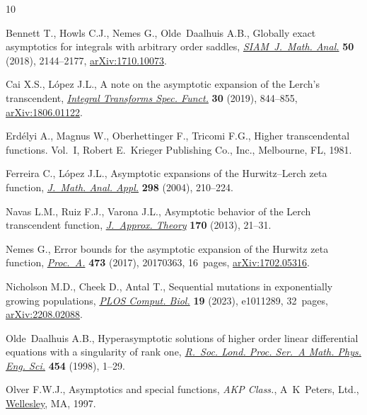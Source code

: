 \documentclass[pdftex]{sigma}
\numberwithin{equation}{section}
\begin{document}
\begin{thebibliography}{10}
\footnotesize\itemsep=0pt

Bennett T., Howls C.J., Nemes G., Olde~Daalhuis A.B., Globally exact
 asymptotics for integrals with arbitrary order saddles, \href{https://doi.org/10.1137/17M1154217}{\textit{SIAM~J.~Math.
 Anal.}} \textbf{50} (2018), 2144--2177, \href{https://arxiv.org/abs/1710.10073}{arXiv:1710.10073}.

Cai X.S., L\'opez J.L., A note on the asymptotic expansion of the {L}erch's
 transcendent, \href{https://doi.org/10.1080/10652469.2019.1627530}{\textit{Integral Transforms Spec. Funct.}} \textbf{30} (2019),
 844--855, \href{https://arxiv.org/abs/1806.01122}{arXiv:1806.01122}.

Erd\'elyi A., Magnus W., Oberhettinger F., Tricomi F.G., Higher transcendental
 functions. {V}ol.~{I}, Robert E.~Krieger Publishing Co., Inc., Melbourne, FL,
 1981.

Ferreira C., L\'opez J.L., Asymptotic expansions of the {H}urwitz--{L}erch zeta
 function, \href{https://doi.org/10.1016/j.jmaa.2004.05.040}{\textit{J.~Math. Anal. Appl.}} \textbf{298} (2004), 210--224.

Navas L.M., Ruiz F.J., Varona J.L., Asymptotic behavior of the {L}erch
 transcendent function, \href{https://doi.org/10.1016/j.jat.2012.03.006}{\textit{J.~Approx. Theory}} \textbf{170} (2013),
 21--31.

Nemes G., Error bounds for the asymptotic expansion of the {H}urwitz zeta
 function, \href{https://doi.org/10.1098/rspa.2017.0363}{\textit{Proc.~A.}} \textbf{473} (2017), 20170363, 16~pages,
 \href{https://arxiv.org/abs/1702.05316}{arXiv:1702.05316}.

Nicholson M.D., Cheek D., Antal T., Sequential mutations in exponentially
 growing populations, \href{https://doi.org/10.1371/journal.pcbi.1011289}{\textit{PLOS Comput. Biol.}} \textbf{19} (2023),
 e1011289, 32~pages, \href{https://arxiv.org/abs/2208.02088}{arXiv:2208.02088}.

Olde~Daalhuis A.B., Hyperasymptotic solutions of higher order linear
 differential equations with a singularity of rank one, \href{https://doi.org/10.1098/rspa.1998.0145}{\textit{R.~Soc. Lond.
 Proc. Ser.~A Math. Phys. Eng. Sci.}} \textbf{454} (1998), 1--29.

Olver F.W.J., Asymptotics and special functions, \textit{AKP Class.}, A~K~Peters, Ltd.,
 \href{https://doi.org/10.1201/9781439864548}{Wellesley}, MA, 1997.


\end{thebibliography}
\end{document}
